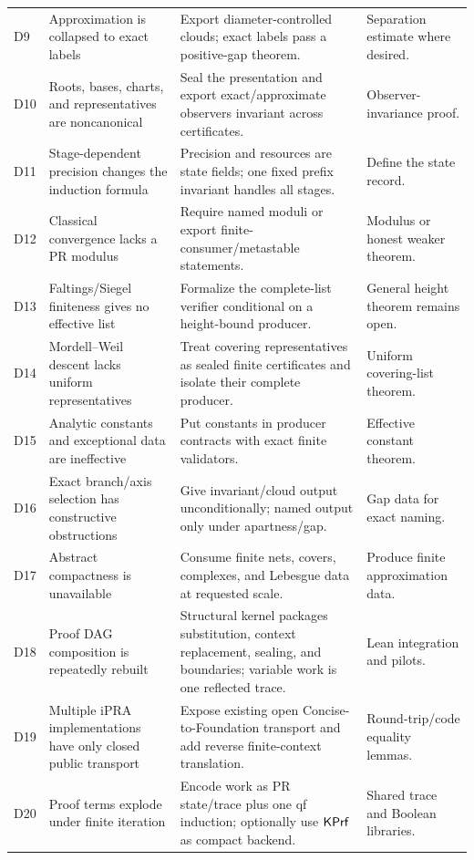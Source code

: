\begin{longtable}{p{}p{}p{}p{}}
D9 & Approximation is collapsed to exact labels & Export diameter-controlled clouds; exact labels pass a positive-gap theorem. & Separation estimate where desired. \\
D10 & Roots, bases, charts, and representatives are noncanonical & Seal the presentation and export exact/approximate observers invariant across certificates. & Observer-invariance proof. \\
D11 & Stage-dependent precision changes the induction formula & Precision and resources are state fields; one fixed prefix invariant handles all stages. & Define the state record. \\
D12 & Classical convergence lacks a PR modulus & Require named moduli or export finite-consumer/metastable statements. & Modulus or honest weaker theorem. \\
D13 & Faltings/Siegel finiteness gives no effective list & Formalize the complete-list verifier conditional on a height-bound producer. & General height theorem remains open. \\
D14 & Mordell--Weil descent lacks uniform representatives & Treat covering representatives as sealed finite certificates and isolate their complete producer. & Uniform covering-list theorem. \\
D15 & Analytic constants and exceptional data are ineffective & Put constants in producer contracts with exact finite validators. & Effective constant theorem. \\
D16 & Exact branch/axis selection has constructive obstructions & Give invariant/cloud output unconditionally; named output only under apartness/gap. & Gap data for exact naming. \\
D17 & Abstract compactness is unavailable & Consume finite nets, covers, complexes, and Lebesgue data at requested scale. & Produce finite approximation data. \\
D18 & Proof DAG composition is repeatedly rebuilt & Structural kernel packages substitution, context replacement, sealing, and boundaries; variable work is one reflected trace. & Lean integration and pilots. \\
D19 & Multiple iPRA implementations have only closed public transport & Expose existing open Concise-to-Foundation transport and add reverse finite-context translation. & Round-trip/code equality lemmas. \\
D20 & Proof terms explode under finite iteration & Encode work as PR state/trace plus one qf induction; optionally use \(\mathsf{KPrf}\) as compact backend. & Shared trace and Boolean libraries. \\
\bottomrule
\end{longtable}
\normalsize

